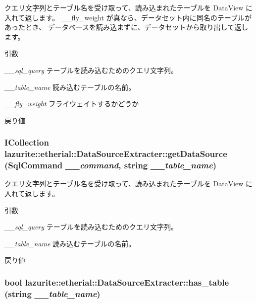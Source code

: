 クエリ文字列とテーブル名を受け取って、読み込まれたテーブルを DataView に入れて返します。 \_\-\_\-fly\_\-weight が真なら、データセット内に同名のテーブルがあったとき、 データベースを読み込まずに、データセットから取り出して返します。


\begin{DoxyParams}{引数}
\item[{\em \_\-\_\-sql\_\-query}]テーブルを読み込むためのクエリ文字列。\item[{\em \_\-\_\-table\_\-name}]読み込むテーブルの名前。\item[{\em \_\-\_\-fly\_\-weight}]フライウェイトするかどうか\end{DoxyParams}
\begin{DoxyReturn}{戻り値}

\end{DoxyReturn}
\hypertarget{classlazurite_1_1etherial_1_1_data_source_extracter_a130cf13a793cc427e4146e27c70972a1}{
\subsubsection[{getDataSource}]{\setlength{\rightskip}{0pt plus 5cm}ICollection lazurite::etherial::DataSourceExtracter::getDataSource (SqlCommand {\em \_\-\_\-command}, \/  string {\em \_\-\_\-table\_\-name})}}
\label{classlazurite_1_1etherial_1_1_data_source_extracter_a130cf13a793cc427e4146e27c70972a1}


クエリ文字列とテーブル名を受け取って、読み込まれたテーブルを DataView に入れて返します。 
\begin{DoxyParams}{引数}
\item[{\em \_\-\_\-sql\_\-query}]テーブルを読み込むためのクエリ文字列。\item[{\em \_\-\_\-table\_\-name}]読み込むテーブルの名前。\end{DoxyParams}
\begin{DoxyReturn}{戻り値}

\end{DoxyReturn}
\hypertarget{classlazurite_1_1etherial_1_1_data_source_extracter_aa440ff94bdb3001c3638def8143ed083}{
\subsubsection[{has\_\-table}]{\setlength{\rightskip}{0pt plus 5cm}bool lazurite::etherial::DataSourceExtracter::has\_\-table (string {\em \_\-\_\-table\_\-name})}}
\label{classlazurite_1_1etherial_1_1_data_source_extracter_aa440ff94bdb3001c3638def8143ed083}


